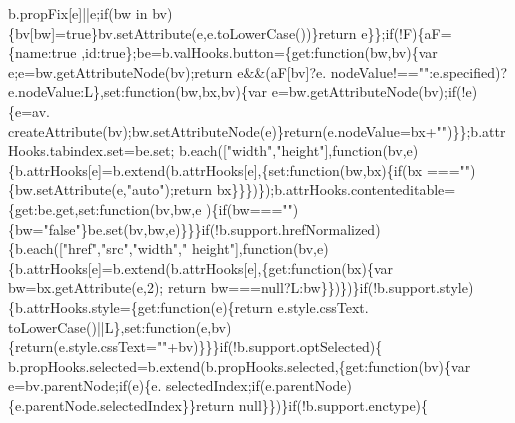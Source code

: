 \begin{DoxyCode}
      b.propFix[e]||e;\textcolor{keywordflow}{if}(bw in bv)\{bv[bw]=\textcolor{keyword}{true}\}bv.setAttribute(e,e.toLowerCase())\}\textcolor{keywordflow}{return} e\}\};\textcolor{keywordflow}{if}(!F)\{aF=\{name:\textcolor{keyword}{true}
      ,\textcolor{keywordtype}{id}:\textcolor{keyword}{true}\};be=b.valHooks.button=\{\textcolor{keyword}{get}:\textcolor{keyword}{function}(bw,bv)\{var e;e=bw.getAttributeNode(bv);\textcolor{keywordflow}{return} e&&(aF[bv]?e.
      nodeValue!==\textcolor{stringliteral}{""}:e.specified)?e.nodeValue:L\},set:\textcolor{keyword}{function}(bw,bx,bv)\{var e=bw.getAttributeNode(bv);\textcolor{keywordflow}{if}(!e)\{e=av.
      createAttribute(bv);bw.setAttributeNode(e)\}\textcolor{keywordflow}{return}(e.nodeValue=bx+\textcolor{stringliteral}{""})\}\};b.attrHooks.tabindex.set=be.set;
      b.each([\textcolor{stringliteral}{"width"},\textcolor{stringliteral}{"height"}],\textcolor{keyword}{function}(bv,e)\{b.attrHooks[e]=b.extend(b.attrHooks[e],\{set:\textcolor{keyword}{function}(bw,bx)\{\textcolor{keywordflow}{if}(bx
      ===\textcolor{stringliteral}{""})\{bw.setAttribute(e,\textcolor{stringliteral}{"auto"});\textcolor{keywordflow}{return} bx\}\}\})\});b.attrHooks.contenteditable=\{\textcolor{keyword}{get}:be.get,set:\textcolor{keyword}{function}(bv,bw,e
      )\{\textcolor{keywordflow}{if}(bw===\textcolor{stringliteral}{""})\{bw=\textcolor{stringliteral}{"false"}\}be.set(bv,bw,e)\}\}\}\textcolor{keywordflow}{if}(!b.support.hrefNormalized)\{b.each([\textcolor{stringliteral}{"href"},\textcolor{stringliteral}{"src"},\textcolor{stringliteral}{"width"},\textcolor{stringliteral}{"
      height"}],\textcolor{keyword}{function}(bv,e)\{b.attrHooks[e]=b.extend(b.attrHooks[e],\{\textcolor{keyword}{get}:\textcolor{keyword}{function}(bx)\{var bw=bx.getAttribute(e,2);\textcolor{keywordflow}{
      return} bw===null?L:bw\}\})\})\}\textcolor{keywordflow}{if}(!b.support.style)\{b.attrHooks.style=\{\textcolor{keyword}{get}:\textcolor{keyword}{function}(e)\{\textcolor{keywordflow}{return} e.style.cssText.
      toLowerCase()||L\},set:\textcolor{keyword}{function}(e,bv)\{\textcolor{keywordflow}{return}(e.style.cssText=\textcolor{stringliteral}{""}+bv)\}\}\}\textcolor{keywordflow}{if}(!b.support.optSelected)\{
      b.propHooks.selected=b.extend(b.propHooks.selected,\{\textcolor{keyword}{get}:\textcolor{keyword}{function}(bv)\{var e=bv.parentNode;\textcolor{keywordflow}{if}(e)\{e.
      selectedIndex;\textcolor{keywordflow}{if}(e.parentNode)\{e.parentNode.selectedIndex\}\}\textcolor{keywordflow}{return} null\}\})\}\textcolor{keywordflow}{if}(!b.support.enctype)\{

\end{DoxyCode}
